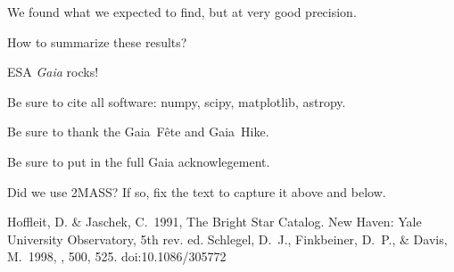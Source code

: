 \documentclass[modern]{aastex631}
\begin{document}
We found what we expected to find, but at very good precision.

How to summarize these results?

ESA \textsl{Gaia} rocks!

\begin{acknowledgements}
Be sure to cite all software: numpy, scipy, matplotlib, astropy.

Be sure to thank the Gaia~F\^ete and Gaia~Hike.

Be sure to put in the full Gaia acknowlegement.

Did we use 2MASS? If so, fix the text to capture it above and below.
\end{acknowledgements}



\begin{thebibliography}{dummy}
Hoffleit, D. \& Jaschek, C.\ 1991, The Bright Star Catalog. New Haven: Yale University Observatory, 5th rev. ed.
 Schlegel, D.~J., Finkbeiner, D.~P., \& Davis, M.\ 1998, \apj, 500, 525. doi:10.1086/305772
\end{thebibliography}
\end{document}
